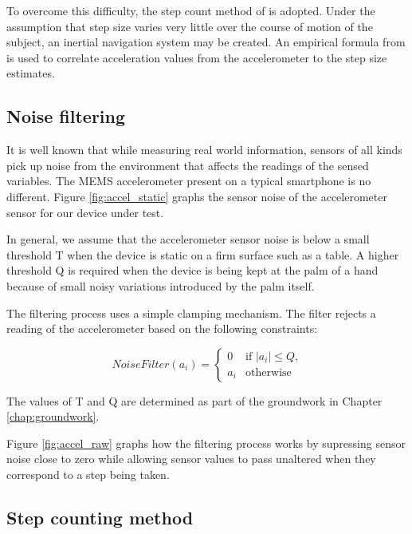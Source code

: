 To overcome this difficulty, the step count method of \cite{Wang} is adopted. 
Under the assumption that step size varies very little over the course of 
motion of the subject, an inertial navigation system may be created. An
empirical formula from \cite{ADXL202} is used to correlate acceleration values from 
the accelerometer to the step size estimates.

\subsection{Noise filtering\label{sec:NoiseClamping}}

It is well known that while measuring real world information, sensors of all 
kinds pick up noise from the environment that affects the readings of the 
sensed variables. The MEMS accelerometer present on a typical smartphone is 
no different. Figure \ref{fig:accel_static} graphs the sensor noise of 
the accelerometer sensor for our device under test.

In general, we assume that the accelerometer sensor noise is below a small 
threshold T when the device is static on a firm surface such as a table. 
A higher threshold Q is required when the device is being kept at the palm of 
a hand because of small noisy variations introduced by the palm itself.

The filtering process uses a simple clamping mechanism. The filter 
rejects a reading of the accelerometer based on the following constraints:

\begin{equation}
NoiseFilter(a_i) =  \begin{cases} 0 & \text{if $|a_i| \le Q$,} \\
                                a_i & \text{otherwise}
                    \end{cases}
\end{equation}

The values of T and Q are determined as part of the groundwork in Chapter 
\ref{chap:groundwork}.

Figure \ref{fig:accel_raw} graphs how the filtering process works by
supressing sensor noise close to zero while allowing sensor values to 
pass unaltered when they correspond to a step being taken.


\subsection{Step counting method}

